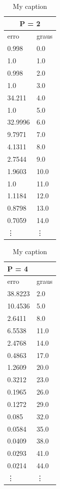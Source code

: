 \begin{table}[]
\centering
\caption{My caption}
\label{my-label}
\begin{tabular}{|l|l|}
\hline
\multicolumn{2}{|c|}{P = 2} \\ \hline
erro          & graus       \\ \hline
0.998         & 0.0         \\ \hline
1.0           & 1.0         \\ \hline
0.998         & 2.0         \\ \hline
1.0           & 3.0         \\ \hline
34.211        & 4.0         \\ \hline
1.0           & 5.0         \\ \hline
32.9996       & 6.0         \\ \hline
9.7971        & 7.0         \\ \hline
4.1311        & 8.0         \\ \hline
2.7544        & 9.0         \\ \hline
1.9603        & 10.0        \\ \hline
1.0           & 11.0        \\ \hline
1.1184        & 12.0        \\ \hline
0.8798        & 13.0        \\ \hline
0.7059        & 14.0        \\ \hline
\vdots	      & \vdots      \\
\end{tabular}
\begin{tabular}{|l|l|}
\hline
\multicolumn{2}{|l|}{P = 4} \\ \hline
erro          & graus       \\ \hline
38.8223       & 2.0         \\ \hline
10.4536       & 5.0         \\ \hline
2.6411        & 8.0         \\ \hline
6.5538        & 11.0        \\ \hline
2.4768        & 14.0        \\ \hline
0.4863        & 17.0        \\ \hline
1.2609        & 20.0        \\ \hline
0.3212        & 23.0        \\ \hline
0.1965        & 26.0        \\ \hline
0.1272        & 29.0        \\ \hline
0.085         & 32.0        \\ \hline
0.0584        & 35.0        \\ \hline
0.0409        & 38.0        \\ \hline
0.0293        & 41.0        \\ \hline
0.0214        & 44.0        \\ \hline
\vdots	      & \vdots      \\


\end{tabular}
\end{table}
